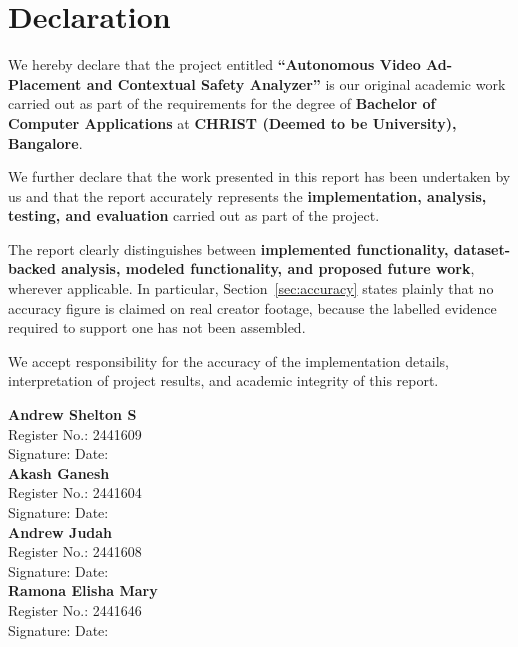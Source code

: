 \documentclass[
12pt,
a4paper,
oneside
]{report}
\begin{document}

\chapter*{Declaration}

We hereby declare that the project entitled \textbf{``Autonomous Video
Ad-Placement and Contextual Safety Analyzer''} is our original academic work
carried out as part of the requirements for the degree of \textbf{Bachelor of
Computer Applications} at \textbf{CHRIST (Deemed to be University), Bangalore}.

We further declare that the work presented in this report has been undertaken by
us and that the report accurately represents the \textbf{implementation,
analysis, testing, and evaluation} carried out as part of the project.

The report clearly distinguishes between \textbf{implemented functionality,
dataset-backed analysis, modeled functionality, and proposed future work},
wherever applicable. In particular, Section~\ref{sec:accuracy} states plainly
that no accuracy figure is claimed on real creator footage, because the
labelled evidence required to support one has not been assembled.

We accept responsibility for the accuracy of the implementation details,
interpretation of project results, and academic integrity of this report.

\vspace{0.7cm}

\begin{flushleft}
\textbf{Andrew Shelton S}\\
Register No.: 2441609\\
Signature: \hspace{3cm} Date: \\[.5cm]

\textbf{Akash Ganesh}\\
Register No.: 2441604\\
Signature: \hspace{3cm} Date: \\[.5cm]

\textbf{Andrew Judah}\\
Register No.: 2441608\\
Signature: \hspace{3cm} Date: \\[.5cm]

\textbf{Ramona Elisha Mary}\\
Register No.: 2441646\\
Signature: \hspace{3cm} Date:
\end{flushleft}
\end{document}

